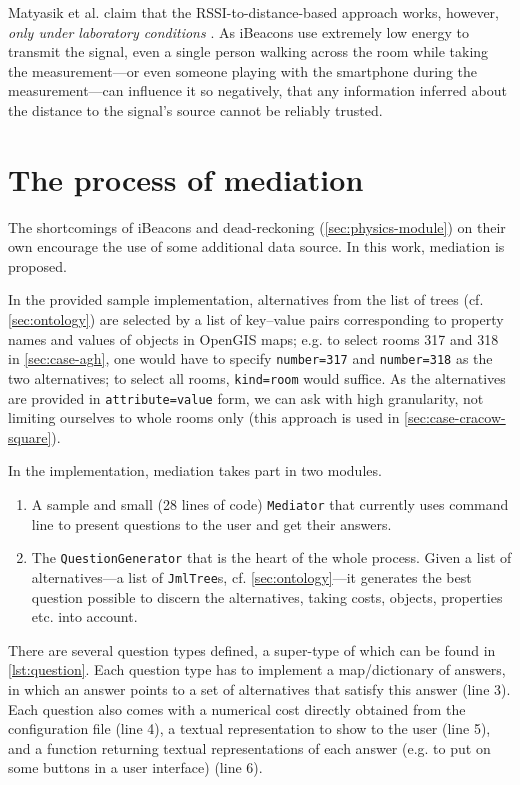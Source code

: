 Matyasik et al. claim that the RSSI-to-distance-based approach works, however, \emph{only under laboratory conditions} \cite{Matyasik:iBeacon, Matyasik:iBeacon:slides}. As iBeacons use extremely low energy to transmit the signal, even a single person walking across the room while taking the measurement---or even someone playing with the smartphone during the measurement---can influence it so negatively, that any information inferred about the distance to the signal's source cannot be reliably trusted.

\section{The process of mediation}
\label{sec:mediation}

The shortcomings of iBeacons and dead-reckoning (\cref{sec:physics-module}) on their own encourage the use of some additional data source. In this work, mediation is proposed.

In the provided sample implementation, alternatives from the list of trees (cf. \cref{sec:ontology}) are selected by a list of key--value pairs corresponding to property names and values of objects in OpenGIS maps; e.g. to select rooms 317 and 318 in \cref{sec:case-agh}, one would have to specify \texttt{number=317} and \texttt{number=318} as the two alternatives; to select all rooms, \texttt{kind=room} would suffice. As the alternatives are provided in \texttt{attribute=value} form, we can ask with high granularity, not limiting ourselves to whole rooms only (this approach is used in \cref{sec:case-cracow-square}).

In the implementation, mediation takes part in two modules.

\begin{enumerate}
	\item A sample and small (28 lines of code) \texttt{Mediator} that currently uses command line to present questions to the user and get their answers. 
	\item The \texttt{QuestionGenerator} that is the heart of the whole process. Given a list of alternatives---a list of \texttt{JmlTree}s, cf. \cref{sec:ontology}---it generates the best question possible to discern the alternatives, taking costs, objects, properties etc. into account.
\end{enumerate}

There are several question types defined, a super-type of which can be found in \cref{lst:question}. Each question type has to implement a map/dictionary of answers, in which an answer points to a set of alternatives that satisfy this answer (line 3). Each question also comes with a numerical cost directly obtained from the configuration file (line 4), a textual representation to show to the user (line 5), and a function returning textual representations of each answer (e.g. to put on some buttons in a user interface) (line 6).

